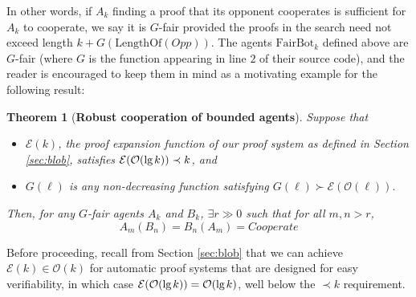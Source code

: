 \documentclass[onecolumn]{miri-tech-article}
\newtheorem{theorem}{Theorem}
\numberwithin{equation}{section}
\theoremstyle{definition}
\newcommand{\Ee}{\mathcal{E}}
\newcommand{\Oo}{\mathcal{O}}
\renewcommand{\lg}{\mathrm{lg\hspace{0.3ex}}}
\renewcommand{\-}{^{-1}}
\newcommand{\FB}{\mathrm{FairBot}}
\begin{document}
In other words, if $A_k$ finding a proof that its opponent cooperates is sufficient for $A_k$ to cooperate, we say it is $G$-fair provided the proofs in the search need not exceed length $k+G(\textrm{LengthOf}(Opp))$.  The agents $\FB_k$ defined above are $G$-fair (where $G$ is the function appearing in line $2$ of their source code), and the reader is encouraged to keep them in mind as a motivating example for the following result:

\begin{theorem}[{\bf Robust cooperation of bounded agents}]\label{thm:rc}Suppose that 
\begin{itemize}
\item $\Ee(k)$, the proof expansion function of our proof system as defined in Section \ref{sec:blob}, satisfies $\Ee (\Oo(\lg k)) \prec k$, and
\item $G(\ell)$ is any non-decreasing function satisfying $G(\ell) \succ \Ee(\Oo(\ell)).$
\end{itemize}
Then, for any $G$-fair agents $A_k$ and $B_k$, $\exists r \gg 0$ such that for all $m,n>r$,
$$A_m(B_n) = B_n(A_m) = Cooperate$$
\end{theorem}

 Before proceeding, recall from Section \ref{sec:blob} that we can achieve $\Ee(k) \in \Oo(k)$ for automatic proof systems that are designed for easy verifiability, in which case $\Ee(\Oo(\lg k)) = \Oo(\lg k)$, well below the $\prec k$ requirement.
\end{document}
